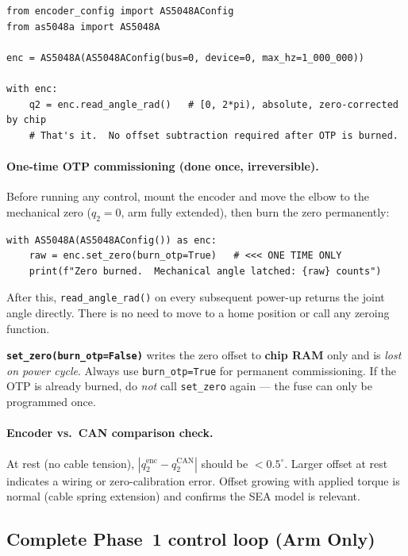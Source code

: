 \documentclass[11pt,a4paper]{article}
\begin{document}
\begin{lstlisting}[caption={AS5048A --- absolute angle read (no offset arithmetic needed).}]
from encoder_config import AS5048AConfig
from as5048a import AS5048A

enc = AS5048A(AS5048AConfig(bus=0, device=0, max_hz=1_000_000))

with enc:
    q2 = enc.read_angle_rad()   # [0, 2*pi), absolute, zero-corrected by chip
    # That's it.  No offset subtraction required after OTP is burned.
\end{lstlisting}

\paragraph{One-time OTP commissioning (done once, irreversible).}
Before running any control, mount the encoder and move the elbow to the
mechanical zero ($q_2{=}0$, arm fully extended), then burn the zero permanently:
\begin{lstlisting}[caption={One-time OTP zero burn.  Do NOT repeat -- fuses are blown permanently.}]
with AS5048A(AS5048AConfig()) as enc:
    raw = enc.set_zero(burn_otp=True)   # <<< ONE TIME ONLY
    print(f"Zero burned.  Mechanical angle latched: {raw} counts")
\end{lstlisting}
After this, \texttt{read\_angle\_rad()} on every subsequent power-up
returns the joint angle directly.  There is no need to move to a home
position or call any zeroing function.

\begin{warnbox}
  \textbf{\texttt{set\_zero(burn\_otp=False)}} writes the zero offset to
  \textbf{chip RAM} only and is \emph{lost on power cycle}.
  Always use \texttt{burn\_otp=True} for permanent commissioning.
  If the OTP is already burned, do \emph{not} call
  \texttt{set\_zero} again --- the fuse can only be programmed once.
\end{warnbox}

\paragraph{Encoder vs.\ CAN comparison check.}
At rest (no cable tension), $|q_2^{\mathrm{enc}} - q_2^{\mathrm{CAN}}|$
should be $<0.5^\circ$.  Larger offset at rest indicates a wiring or
zero-calibration error.  Offset growing with applied torque is normal
(cable spring extension) and confirms the SEA model is relevant.

\subsection{Complete Phase~1 control loop (Arm Only)}
\end{document}
